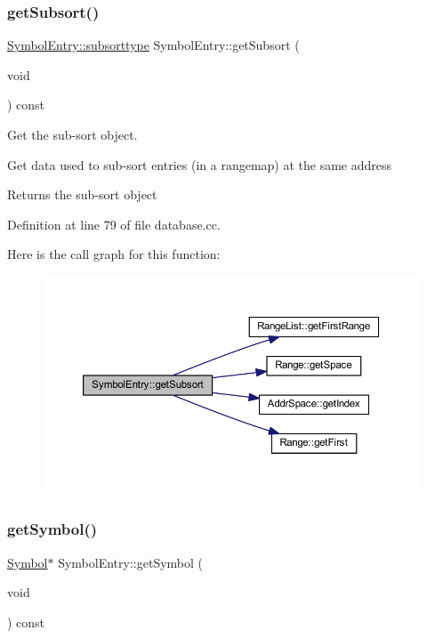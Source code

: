 \subsubsection{\texorpdfstring{getSubsort()}{getSubsort()}}
{\footnotesize\ttfamily \mbox{\hyperlink{class_symbol_entry_a3163188293595446b1f1dafccab7df15}{Symbol\+Entry\+::subsorttype}} Symbol\+Entry\+::get\+Subsort (\begin{DoxyParamCaption}\item[{void}]{ }\end{DoxyParamCaption}) const}



Get the sub-\/sort object. 

Get data used to sub-\/sort entries (in a rangemap) at the same address \begin{DoxyReturn}{Returns}
the sub-\/sort object 
\end{DoxyReturn}


Definition at line 79 of file database.\+cc.

Here is the call graph for this function\+:
\nopagebreak
\begin{figure}[H]
\begin{center}
\leavevmode
\includegraphics[width=350pt]{class_symbol_entry_afb88a4dae96af6bb42c0bd0434d7e756_cgraph}
\end{center}
\end{figure}
\mbox{\label{class_symbol_entry_a4279c38e7f124423d5f6cbb353a33f49}} 
\subsubsection{\texorpdfstring{getSymbol()}{getSymbol()}}
{\footnotesize\ttfamily \mbox{\hyperlink{class_symbol}{Symbol}}$\ast$ Symbol\+Entry\+::get\+Symbol (\begin{DoxyParamCaption}\item[{void}]{ }\end{DoxyParamCaption}) const\hspace{0.3cm}{\ttfamily [inline]}}



